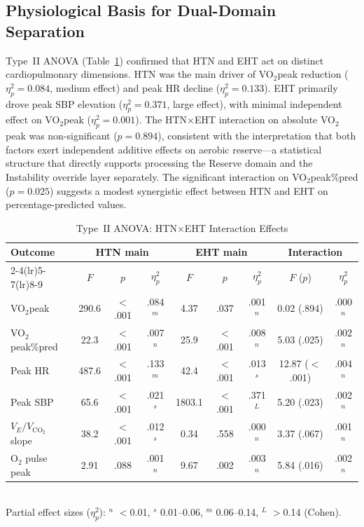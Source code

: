 \documentclass[12pt, a4paper]{article}
\begin{document}
\subsection{Physiological Basis for Dual-Domain Separation}

Type~II ANOVA (Table~\ref{tab:anova_en}) confirmed that HTN and EHT act on
distinct cardiopulmonary dimensions. HTN was the main driver of VO$_2$peak
reduction ($\eta^2_p = 0.084$, medium effect) and peak HR decline
($\eta^2_p = 0.133$). EHT primarily drove peak SBP elevation
($\eta^2_p = 0.371$, large effect), with minimal independent effect on VO$_2$peak
($\eta^2_p = 0.001$). The HTN$\times$EHT interaction on absolute VO$_2$peak was
non-significant ($p = 0.894$), consistent with the interpretation that both factors
exert independent additive effects on aerobic reserve---a statistical structure that
directly supports processing the Reserve domain and the Instability override layer
separately. The significant interaction on VO$_2$peak\%pred ($p = 0.025$) suggests
a modest synergistic effect between HTN and EHT on percentage-predicted values.

\begin{table}[htbp]
\centering
\small
\caption{Type~II ANOVA: HTN$\times$EHT Interaction Effects}
\label{tab:anova_en}
\begin{tabular}{lcccccccc}
\toprule
\multirow{2}{*}{Outcome} & \multicolumn{3}{c}{HTN main} & \multicolumn{3}{c}{EHT main} & \multicolumn{2}{c}{Interaction} \\
\cmidrule(lr){2-4}\cmidrule(lr){5-7}\cmidrule(lr){8-9}
 & $F$ & $p$ & $\eta^2_p$ & $F$ & $p$ & $\eta^2_p$ & $F$ ($p$) & $\eta^2_p$ \\
\midrule
VO$_2$peak & 290.6 & $<$.001 & .084$^m$ & 4.37 & .037 & .001$^n$ & 0.02 (.894) & .000$^n$ \\
VO$_2$peak\%pred & 22.3 & $<$.001 & .007$^n$ & 25.9 & $<$.001 & .008$^n$ & 5.03 (.025) & .002$^n$ \\
Peak HR & 487.6 & $<$.001 & .133$^m$ & 42.4 & $<$.001 & .013$^s$ & 12.87 ($<$.001) & .004$^n$ \\
Peak SBP & 65.6 & $<$.001 & .021$^s$ & 1803.1 & $<$.001 & .371$^L$ & 5.20 (.023) & .002$^n$ \\
$V_E/V_{\text{CO}_2}$ slope & 38.2 & $<$.001 & .012$^s$ & 0.34 & .558 & .000$^n$ & 3.37 (.067) & .001$^n$ \\
O$_2$ pulse peak & 2.91 & .088 & .001$^n$ & 9.67 & .002 & .003$^n$ & 5.84 (.016) & .002$^n$ \\
\bottomrule
\end{tabular}
\\[1ex]
{\footnotesize Partial effect sizes ($\eta^2_p$): $^n$ $<$0.01, $^s$ 0.01--0.06, $^m$ 0.06--0.14, $^L$ $>$0.14 (Cohen\cite{Cohen1988}).}
\end{table}
\end{document}
